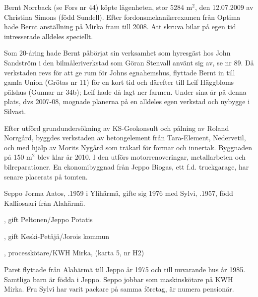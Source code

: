 %
Bernt Norrback (se Fors nr 44) köpte lägenheten, stor 5284 m$^2$, den 12.07.2009  av Christina Simons (född Sundell). Efter fordonsmekanikerexamen från Optima hade Bernt anställning på Mirka fram till 2008. Att skruva bilar på egen tid intresserade alldeles speciellt.

Som 20-åring hade Bernt påbörjat sin verksamhet som hyresgäst	hos John Sandström i den bilmåleriverkstad som Göran Stenvall använt sig av, se nr 89. Då verkstaden revs för att ge rum för Johns egnahemshus, flyttade Bernt in till gamla Union (Grötas nr 11) för en kort tid och därefter till Leif Häggbloms pälshus (Gunnar nr 34b); Leif hade då lagt ner farmen. Under sina år på denna plats, dvs 2007-08, mognade	planerna på en alldeles egen verkstad och nybygge i Silvast.

Efter utförd grundundersökning av KS-Geokonsult och pålning av Roland Norrgård, byggdes verkstaden av betongelement från Tara-Element, Nedervetil, och med hjälp av Morits Nygård som träkarl för formar och innertak. Byggnaden på 150 m$^2$ blev klar år 2010. I den utförs	motorrenoveringar, metallarbeten och bilreparationer. En ekonomibyggnad från Jeppo Biogas, ett f.d. truckgarage, har senare placerats på tomten.



%



%
Seppo Jorma Aatos, .1959 i Ylihärmä, gifte sig 1976 med Sylvi, .1957,	född Kalliosaari från Alahärmä.
\begin{jhchildren}
  \item {}, gift Peltonen/Jeppo Potatis
  \item {}, gift Keski-Petäjä/Jorois kommun
  \item {}, processkötare/KWH Mirka, (karta 5, nr H2)
\end{jhchildren}

Paret flyttade från Alahärmä till Jeppo år 1975 och till nuvarande hus år 1985. Samtliga barn är födda i Jeppo. Seppo jobbar som maskinskötare på KWH Mirka. Fru Sylvi har varit packare på samma företag, är numera pensionär.

